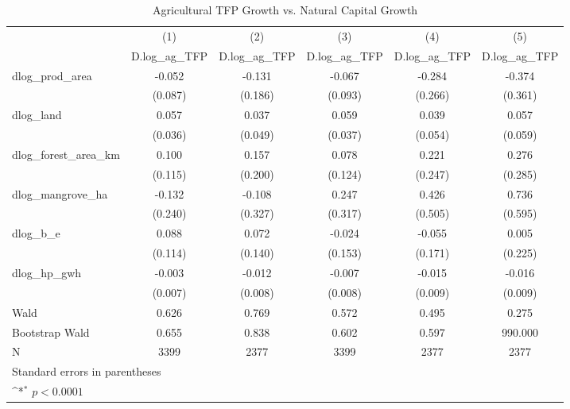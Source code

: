 \begin{table}[htbp]\centering
\def\sym#1{\ifmmode^{#1}\else\(^{#1}\)\fi}
\caption{Agricultural TFP Growth vs. Natural Capital Growth}
\begin{tabular}{l*{5}{c}}
\hline\hline
            &\multicolumn{1}{c}{(1)}&\multicolumn{1}{c}{(2)}&\multicolumn{1}{c}{(3)}&\multicolumn{1}{c}{(4)}&\multicolumn{1}{c}{(5)}\\
            &\multicolumn{1}{c}{D.log\_ag\_TFP}&\multicolumn{1}{c}{D.log\_ag\_TFP}&\multicolumn{1}{c}{D.log\_ag\_TFP}&\multicolumn{1}{c}{D.log\_ag\_TFP}&\multicolumn{1}{c}{D.log\_ag\_TFP}\\
\hline
dlog\_prod\_area&      -0.052       &      -0.131       &      -0.067       &      -0.284       &      -0.374       \\
            &     (0.087)       &     (0.186)       &     (0.093)       &     (0.266)       &     (0.361)       \\
[1em]
dlog\_land   &       0.057       &       0.037       &       0.059       &       0.039       &       0.057       \\
            &     (0.036)       &     (0.049)       &     (0.037)       &     (0.054)       &     (0.059)       \\
[1em]
dlog\_forest\_area\_km&       0.100       &       0.157       &       0.078       &       0.221       &       0.276       \\
            &     (0.115)       &     (0.200)       &     (0.124)       &     (0.247)       &     (0.285)       \\
[1em]
dlog\_mangrove\_ha&      -0.132       &      -0.108       &       0.247       &       0.426       &       0.736       \\
            &     (0.240)       &     (0.327)       &     (0.317)       &     (0.505)       &     (0.595)       \\
[1em]
dlog\_b\_e    &       0.088       &       0.072       &      -0.024       &      -0.055       &       0.005       \\
            &     (0.114)       &     (0.140)       &     (0.153)       &     (0.171)       &     (0.225)       \\
[1em]
dlog\_hp\_gwh &      -0.003       &      -0.012       &      -0.007       &      -0.015       &      -0.016       \\
            &     (0.007)       &     (0.008)       &     (0.008)       &     (0.009)       &     (0.009)       \\
\hline
Wald        &       0.626       &       0.769       &       0.572       &       0.495       &       0.275       \\
Bootstrap Wald&       0.655       &       0.838       &       0.602       &       0.597       &     990.000       \\
N           &        3399       &        2377       &        3399       &        2377       &        2377       \\
\hline\hline
\multicolumn{6}{l}{\footnotesize Standard errors in parentheses}\\
\multicolumn{6}{l}{\footnotesize \sym{*} \(p<0.0001\)}\\
\end{tabular}
\end{table}
